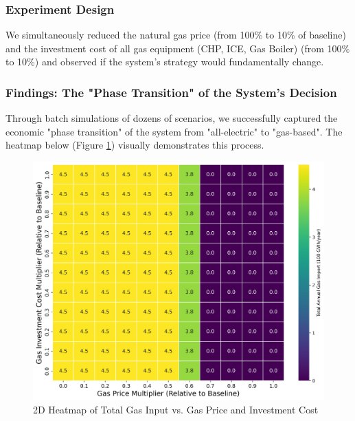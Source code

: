 \documentclass[12pt, a4paper]{article}
\begin{document}
\subsubsection*{Experiment Design}
We simultaneously reduced the natural gas price (from 100\% to 10\% of baseline) and the investment cost of all gas equipment (CHP, ICE, Gas Boiler) (from 100\% to 10\%) and observed if the system's strategy would fundamentally change.

\subsubsection*{Findings: The "Phase Transition" of the System's Decision}
Through batch simulations of dozens of scenarios, we successfully captured the economic "phase transition" of the system from "all-electric" to "gas-based". The heatmap below (Figure \ref{fig:gas_heatmap}) visually demonstrates this process.

\begin{figure}[ht]
    \centering
    \includegraphics[width=\textwidth]{plots/gas_viability_heatmap.png}
    \caption{2D Heatmap of Total Gas Input vs. Gas Price and Investment Cost}
    \label{fig:gas_heatmap}
\end{figure}
\end{document}

